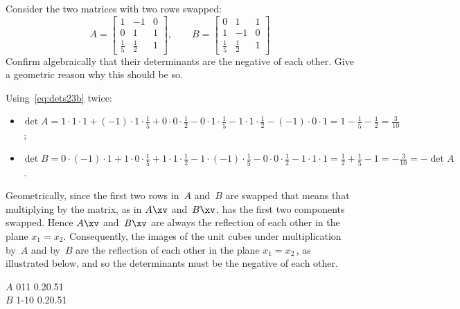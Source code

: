 \begin{example} \label{eg:detswap}
Consider the two matrices with two rows swapped:
\begin{equation*}
A=\begin{bmatrix} 1&-1&0
\\0&1&1
\\\frac15&\frac12&1 \end{bmatrix},\qquad
B=\begin{bmatrix} 0&1&1
\\1&-1&0
\\\frac15&\frac12&1 \end{bmatrix}
\end{equation*}
Confirm algebraically that their determinants are the negative of each other.
Give a geometric reason why this should be so.
\begin{solution} 
Using~\eqref{eq:dets23b} twice: 
\begin{itemize}
\item \(\det A 
=1\cdot1\cdot1 +(-1)\cdot1\cdot\frac15 +0\cdot0\cdot\frac12
-0\cdot1\cdot\frac15 -1\cdot1\cdot\frac12 -(-1)\cdot0\cdot1 
=1-\frac15-\frac12=\frac3{10}\)\,;  
\item \(\det B =0\cdot(-1)\cdot1 
+1\cdot0\cdot\frac15 
+1\cdot1\cdot\frac12
-1\cdot(-1)\cdot\frac15 
-0\cdot0\cdot\frac12 
-1\cdot1\cdot1 
=\frac12+\frac15-1=-\frac3{10}=-\det A\)\,.
\end{itemize}
  

Geometrically, since the first two rows in~\(A\) and~\(B\) are swapped that means that multiplying by the matrix, as in \(A\xv\) and~\(B\xv\), has the first two components swapped.
Hence \(A\xv\) and~\(B\xv\) are always the reflection of each other in the plane \(x_1=x_2\).
Consequently, the images of the unit cubes under multiplication by~\(A\) and by~\(B\) are the reflection of each other in the plane \(x_1=x_2\)\,, as illustrated below,
and so the determinants must be the negative of each other.
\begin{center}
\def\unithouseviews{25,20}
\(A\)\quad{}
011
{0.2}{0.5}1
\\
\(B\)\quad{}
1{-1}{0}
{0.2}{0.5}1
\end{center}
\end{solution}
\end{example}




